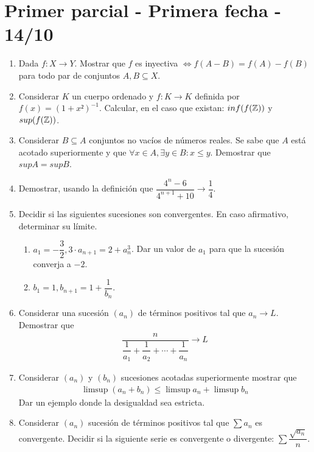 \section{Primer parcial - Primera fecha - 14/10}

\begin{enumerate}
  \item Dada \(f: X \to Y\). Mostrar que \(f\) es inyectiva \(\iff f(A-B) = f(A) - f(B)\) para todo par de conjuntos \(A, B \subseteq X\).
  \item Considerar \(K\) un cuerpo ordenado y \(f: K \to K\) definida por \(f(x) = (1+x²)^{-1}\). Calcular, en el caso que existan: \(inf(f(\mathbb{Z}))\) y \(sup(f(\mathbb{Z}))\).
  \item Considerar \(B \subseteq A\) conjuntos no vacíos de números reales. Se sabe que \(A\) está acotado superiormente y que \(\forall x \in A, \exists y \in B : x \leq y\). Demostrar que \(sup A = sup B\).
  \item Demostrar, usando la definición que \(\dfrac{4^n - 6}{4^{n+1}+10} \to \dfrac{1}{4}\).
  \item Decidir si las siguientes sucesiones son convergentes. En caso afirmativo, determinar su límite. \begin{enumerate}
          \item \(a_1 = -\dfrac{3}{2}, 3 \cdot a_{n+1} = 2 + a_n^3\). Dar un valor de \(a_1\) para que la sucesión converja a \(-2\).
          \item \(b_1 = 1, b_{n+1} = 1 + \dfrac{1}{b_n}\).
        \end{enumerate}
  \item Considerar una sucesión \((a_n)\) de términos positivos tal que \(a_n \to L\). Demostrar que \begin{align*} \dfrac{n}{\dfrac{1}{a_1} + \dfrac{1}{a_2} + \cdots + \dfrac{1}{a_n}} \to L \end{align*}
  \item Considerar \((a_n)\) y \((b_n)\) sucesiones acotadas superiormente mostrar que \begin{align*} \limsup(a_n + b_n) \leq \limsup a_n + \limsup b_n \end{align*} Dar un ejemplo donde la desigualdad sea estricta.
  \item Considerar \((a_n)\) sucesión de términos positivos tal que \(\sum a_n\) es convergente. Decidir si la siguiente serie es convergente o divergente: \(\sum \dfrac{\sqrt{a_n}}{n}\).
\end{enumerate}

\clearpage

